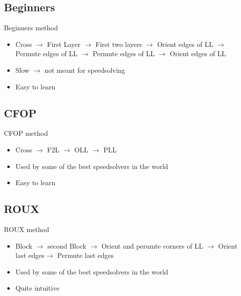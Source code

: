 \documentclass[10pt]{beamer}
\begin{document}
        \subsection{Beginners}
            \begin{frame}{Beginners method}
                \begin{itemize}
                    \item Cross $\rightarrow{}$ First Layer $\rightarrow{}$ First two layers $\rightarrow{}$ Orient edges of LL $\rightarrow{}$ Permute edges of LL $\rightarrow{}$ Permute edges of LL $\rightarrow{}$ Orient edges of LL \pause{} 
                    \item Slow $\rightarrow{}$ not meant for speedsolving \pause{}
                    \item Easy to learn
                \end{itemize}
            \end{frame}
        \subsection{CFOP}
            \begin{frame}{CFOP method}
                \begin{itemize}
                    \item Cross $\rightarrow{}$ F2L $\rightarrow{}$ OLL $\rightarrow{}$ PLL \pause{} 
                    \item Used by some of the best speedsolvers in the world \pause{}
                    \item Easy to learn
                \end{itemize}
            \end{frame}
        \subsection{ROUX}
        \begin{frame}{ROUX method}
                \begin{itemize}
                    \item Block $\rightarrow{}$ second Block $\rightarrow{}$ Orient and perumte corners of LL $\rightarrow{}$ Orient last edges$\rightarrow{}$ Permute last edges \pause{} 
                    \item Used by some of the best speedsolvers in the world \pause{}
                    \item Quite intuitive
                \end{itemize}
            \end{frame}
\end{document}
